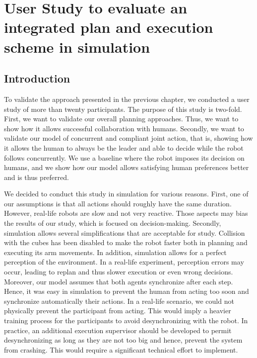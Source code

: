 \ifdefined{}
\else
\setcounter{chapter}{5} 
\dominitoc
\faketableofcontents
\fi

\chapter{User Study to evaluate an integrated plan and execution scheme in simulation}
\label{chap:6}
\minitoc


\section{Introduction}

To validate the approach presented in the previous chapter, we conducted a user study of more than twenty participants. The purpose of this study is two-fold. 
First, we want to validate our overall planning approaches. Thus, we want to show how it allows successful collaboration with humans. 
Secondly, we want to validate our model of concurrent and compliant joint action, that is, showing how it allows the human to always be the leader and able to decide while the robot follows concurrently. We use a baseline where the robot imposes its decision on humans, and we show how our model allows satisfying human preferences better and is thus preferred. 

We decided to conduct this study in simulation for various reasons. First, one of our assumptions is that all actions should roughly have the same duration. However, real-life robots are slow and not very reactive. Those aspects may bias the results of our study, which is focused on decision-making. Secondly, simulation allows several simplifications that are acceptable for study. Collision with the cubes has been disabled to make the robot faster both in planning and executing its arm movements. In addition, simulation allows for a perfect perception of the environment. In a real-life experiment, perception errors may occur, leading to replan and thus slower execution or even wrong decisions. Moreover, our model assumes that both agents synchronize after each step. Hence, it was easy in simulation to prevent the human from acting too soon and synchronize automatically their actions. In a real-life scenario, we could not physically prevent the participant from acting. This would imply a heavier training process for the participants to avoid desynchronizing with the robot. In practice, an additional execution supervisor should be developed to permit desynchronizing as long as they are not too big and hence, prevent the system from crashing. This would require a significant technical effort to implement.

